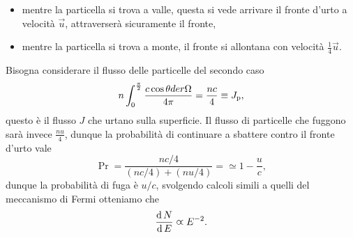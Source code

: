 \begin{itemize}
    \item mentre la particella si trova a valle, questa si vede arrivare il fronte d'urto a velocità $\vec{u}$, attraverserà sicuramente il fronte,
    \item mentre la particella si trova a monte, il fronte si allontana con velocità $\frac{1}{4}\vec{u}$. 
\end{itemize}
Bisogna considerare il flusso delle particelle del secondo caso
\begin{equation*}
    n \int_0^{\frac{\pi}{2}} \frac{c\cos \theta der \Omega}{4\pi} = \frac{nc}{4} \equiv J_\textup{p},
\end{equation*}
questo è il flusso $J$ che urtano sulla superficie. Il flusso di particelle che fuggono sarà invece $\frac{nu}{4}$, dunque la probabilità di continuare a sbattere contro il fronte d'urto vale 
\begin{equation*}
    \Pr = \frac{nc / 4}{(nc/4) + (nu/4)} = \simeq 1 - \frac{u}{c},
\end{equation*}
dunque la probabilità di fuga è $u/c$, svolgendo calcoli simili a quelli del meccanismo di Fermi otteniamo che
\begin{equation*}
    \frac{\operatorname{d} N}{\operatorname{d} E} \varpropto E^{-2}.
\end{equation*}

